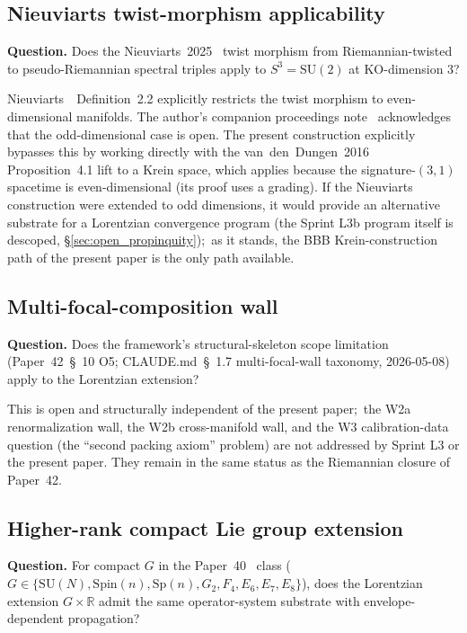 \documentclass[11pt,a4paper]{article}
\theoremstyle{plain}
\theoremstyle{definition}
\newcommand{\sthree}{S^{3}}
\newcommand{\R}{\mathbb{R}}
\newcommand{\SU}{\mathrm{SU}}
\begin{document}
\subsection{Nieuviarts twist-morphism applicability}\label{sec:open_nieuviarts}

\textbf{Question.} Does the Nieuviarts~2025~\cite{nieuviarts2025a}
twist morphism from Riemannian-twisted to pseudo-Riemannian spectral
triples apply to $\sthree = \SU(2)$ at KO-dimension $3$?

Nieuviarts~\cite{nieuviarts2025a}~Definition~2.2 explicitly restricts
the twist morphism to even-dimensional manifolds. The author's
companion proceedings note~\cite{nieuviarts2025b_proceedings}
acknowledges that the odd-dimensional case is open. The present
construction explicitly bypasses this by working directly with the
van~den~Dungen~2016~\cite{vandungen2016} Proposition~4.1 lift to a
Krein space, which applies because the signature-$(3,1)$ spacetime is
even-dimensional (its proof uses a grading). If the
Nieuviarts construction were extended to odd dimensions, it would
provide an alternative substrate for a Lorentzian convergence program
(the Sprint L3b program itself is descoped,
\S\ref{sec:open_propinquity});\ as it
stands, the BBB Krein-construction path of the present paper is the
only path available.

\subsection{Multi-focal-composition wall}\label{sec:open_multifocal}

\textbf{Question.} Does the framework's structural-skeleton scope
limitation (Paper~42~\S~10 O5; CLAUDE.md~\S~1.7 multi-focal-wall
taxonomy, 2026-05-08) apply to the Lorentzian extension?

This is open and structurally independent of the present paper;\ the
W2a renormalization wall, the W2b cross-manifold wall, and the W3
calibration-data question (the ``second packing axiom''
problem) are not addressed by Sprint L3 or the present paper. They
remain in the same status as the Riemannian closure of Paper~42.

\subsection{Higher-rank compact Lie group extension}\label{sec:open_higher_rank}

\textbf{Question.} For compact $G$ in the Paper~40~\cite{paper40_unified}
class ($G \in \{\SU(N), \mathrm{Spin}(n), \mathrm{Sp}(n), G_2, F_4,
E_6, E_7, E_8\}$), does the Lorentzian extension $G \times \R$ admit
the same operator-system substrate with envelope-dependent
propagation?
\end{document}
